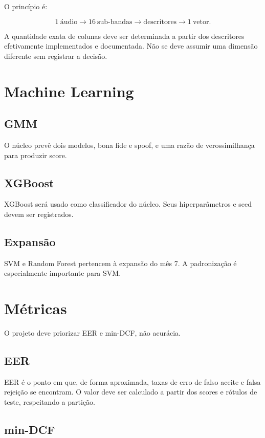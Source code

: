 \documentclass[12pt,a4paper]{article}
\begin{document}
O princípio é:

\[
1\ \text{áudio} \rightarrow 16\ \text{sub-bandas}
\rightarrow \text{descritores} \rightarrow 1\ \text{vetor}.
\]

A quantidade exata de colunas deve ser determinada a partir dos descritores efetivamente implementados e documentada. Não se deve assumir uma dimensão diferente sem registrar a decisão.

\section{Machine Learning}

\subsection{GMM}

O núcleo prevê dois modelos, bona fide e spoof, e uma razão de verossimilhança para produzir score.

\subsection{XGBoost}

XGBoost será usado como classificador do núcleo. Seus hiperparâmetros e seed devem ser registrados.

\subsection{Expansão}

SVM e Random Forest pertencem à expansão do mês 7. A padronização é especialmente importante para SVM.

\section{Métricas}

O projeto deve priorizar EER e min-DCF, não acurácia.

\subsection{EER}

EER é o ponto em que, de forma aproximada, taxas de erro de falso aceite e falsa rejeição se encontram. O valor deve ser calculado a partir dos scores e rótulos de teste, respeitando a partição.

\subsection{min-DCF}
\end{document}
